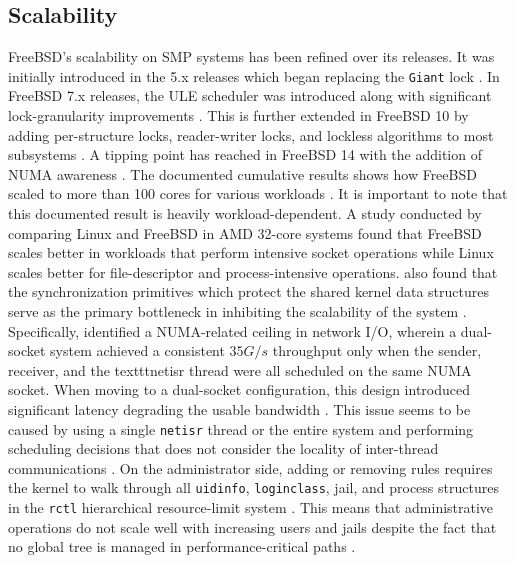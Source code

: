 \subsection{Scalability} \label{scalability} %

FreeBSD's scalability on SMP systems has been refined over its releases. It was initially introduced in the 5.x releases
which began replacing the \texttt{Giant} lock \parencite{freebsd_vs_dragonfly}. In FreeBSD 7.x releases, the ULE scheduler
was introduced along with significant lock-granularity improvements \parencite{freebsd_vs_dragonfly}. This is further extended
in FreeBSD 10 by adding per-structure locks, reader-writer locks, and lockless algorithms to most subsystems
\parencite{freebsd_vs_dragonfly}. A tipping point has reached in FreeBSD 14 with the addition of NUMA awareness
\parencite{freebsd_vs_dragonfly}. The documented cumulative results shows how FreeBSD scaled to more than 100 cores for
various workloads \parencite{freebsd_vs_dragonfly}. It is important to note that this documented result is heavily
workload-dependent. A study conducted by \textcite{cui2011} comparing Linux and FreeBSD in AMD 32-core systems found that
FreeBSD scales better in workloads that perform intensive socket operations while Linux scales better for file-descriptor
and process-intensive operations. \textcite{cui2011} also found that the synchronization primitives which protect the shared
kernel data structures serve as the primary bottleneck in inhibiting the scalability of the system \parencite{cui2011}.
Specifically, \textcite{freebsd_processor_trends} identified a NUMA-related ceiling in network I/O, wherein a dual-socket
system achieved a consistent $35 G/s$ throughput only when the sender, receiver, and the texttt{netisr} thread were all scheduled
on the same NUMA socket. When moving to a dual-socket configuration, this design introduced significant latency degrading
the usable bandwidth \parencite{freebsd_processor_trends}. This issue seems to be caused by using a single \texttt{netisr}
thread or the entire system and performing scheduling decisions that does not consider the locality of inter-thread communications
\parencite{freebsd_processor_trends}. On the administrator side, adding or removing rules requires the kernel to walk through
all \texttt{uidinfo}, \texttt{loginclass}, jail, and process structures in the \texttt{rctl} hierarchical resource-limit
system \parencite{freebsd_resource_limits}. This means that administrative operations do not scale well with increasing users
and jails despite the fact that no global tree is managed in performance-critical paths \parencite{freebsd_resource_limits}.


